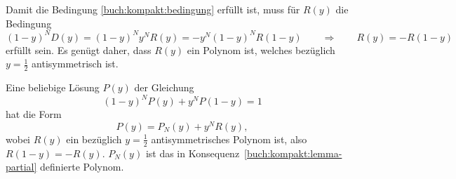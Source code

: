 Damit die Bedingung \eqref{buch:kompakt:bedingung} erfüllt ist, muss
für $R(y)$ die Bedingung
\[
(1-y)^N
D(y)
=
(1-y)^N
y^N
R(y)
=
-y^N
(1-y)^N
R(1-y)
\qquad\Rightarrow\qquad
R(y) = -R(1-y)
\]
erfüllt sein.
Es genügt daher, dass $R(y)$ ein Polynom ist, welches bezüglich $y=\frac12$
antisymmetrisch ist.

\begin{konsequenz}
Eine beliebige Lösung $P(y)$ der Gleichung 
\[
(1-y)^N P(y) + y^N P(1-y)=1
\]
hat die Form
\[
P(y) = P_N(y) + y^N R(y),
\]
wobei $R(y)$ ein bezüglich $y=\frac12$ antisymmetrisches Polynom ist,
also $R(1-y)=-R(y)$.
$P_N(y)$ ist das in Konsequenz~\ref{buch:kompakt:lemma-partial}
definierte Polynom.
\end{konsequenz}




